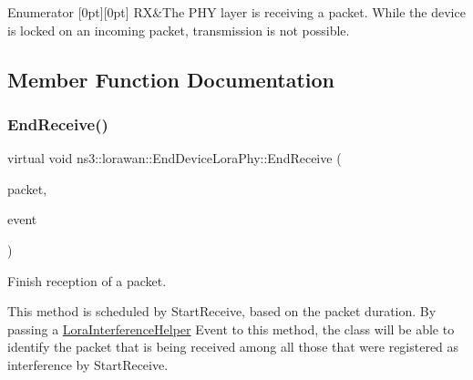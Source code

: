 \begin{DoxyEnumFields}{Enumerator}
[0pt][0pt]{}\mbox{\label{classns3_1_1lorawan_1_1EndDeviceLoraPhy_adc84e4ce7796e19f19f077df9592af15a25a7f183ed9b12f183b7fc6eb553cb5c}} 
RX&The P\+HY layer is receiving a packet. While the device is locked on an incoming packet, transmission is not possible. \\
\hline

\end{DoxyEnumFields}


\subsection{Member Function Documentation}
\mbox{\label{classns3_1_1lorawan_1_1EndDeviceLoraPhy_af5618e5c03f0010244fcde7922d9899f}} 
\subsubsection{\texorpdfstring{End\+Receive()}{EndReceive()}}
{\footnotesize\ttfamily virtual void ns3\+::lorawan\+::\+End\+Device\+Lora\+Phy\+::\+End\+Receive (\begin{DoxyParamCaption}\item[{Ptr$<$ Packet $>$}]{packet,  }\item[{Ptr$<$ \hyperlink{classns3_1_1lorawan_1_1LoraInterferenceHelper_1_1Event}{Lora\+Interference\+Helper\+::\+Event} $>$}]{event }\end{DoxyParamCaption})\hspace{0.3cm}{\ttfamily [pure virtual]}}

Finish reception of a packet.

This method is scheduled by Start\+Receive, based on the packet duration. By passing a \hyperlink{classns3_1_1lorawan_1_1LoraInterferenceHelper}{Lora\+Interference\+Helper} Event to this method, the class will be able to identify the packet that is being received among all those that were registered as interference by Start\+Receive.


